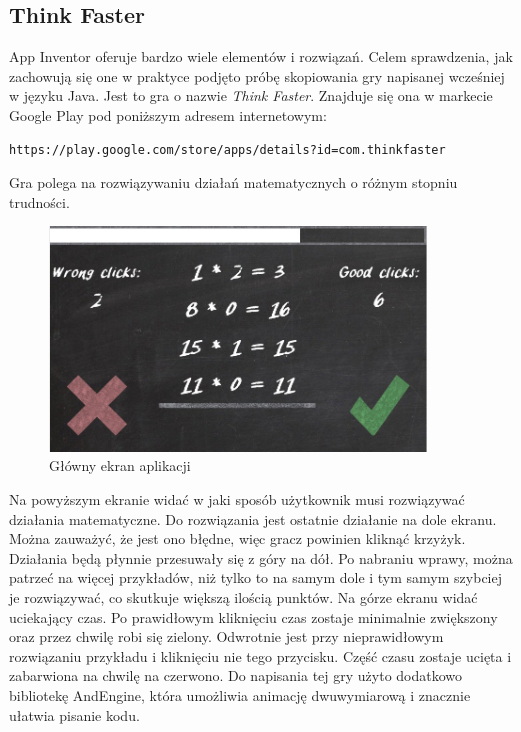 \subsection{Think Faster}

App Inventor oferuje bardzo wiele elementów i rozwiązań. Celem sprawdzenia, jak zachowują się one w praktyce podjęto próbę skopiowania gry napisanej wcześniej w języku Java. Jest to gra o nazwie \emph{Think Faster}. Znajduje się ona w markecie Google Play pod poniższym adresem internetowym:

\begin{lstlisting}
https://play.google.com/store/apps/details?id=com.thinkfaster
\end{lstlisting} 

Gra polega na rozwiązywaniu działań matematycznych o różnym stopniu trudności. 

\begin{figure}[H]
\centering\includegraphics[width=10cm]{figures/apps/thinkfaster_newgame}
\caption{Główny ekran aplikacji}
\end{figure}

Na powyższym ekranie widać w jaki sposób użytkownik musi rozwiązywać działania matematyczne. Do rozwiązania jest ostatnie działanie na dole ekranu. Można zauważyć, że jest ono błędne, więc gracz powinien kliknąć krzyżyk. Działania będą płynnie przesuwały się z góry na dół. Po nabraniu wprawy, można patrzeć na więcej przykładów, niż tylko to na samym dole i tym samym szybciej je rozwiązywać, co skutkuje większą ilością punktów. Na górze ekranu widać uciekający czas. Po prawidłowym kliknięciu czas zostaje minimalnie zwiększony oraz przez chwilę robi się zielony. Odwrotnie jest przy nieprawidłowym rozwiązaniu przykładu i kliknięciu nie tego przycisku. Część czasu zostaje ucięta i zabarwiona na chwilę na czerwono. Do napisania tej gry użyto dodatkowo bibliotekę AndEngine, która umożliwia animację dwuwymiarową i znacznie ułatwia pisanie kodu.



